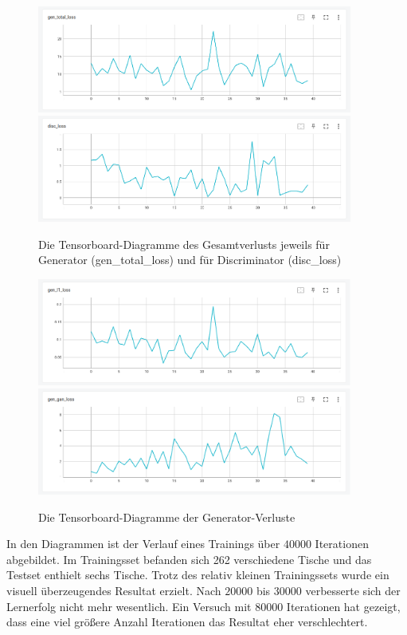 \begin{figure}[h]
	\centering
	\includegraphics[width=0.925\textwidth]{bilder/pix2pix_progress/gen_total_loss.png}
	\includegraphics[width=0.925\textwidth]{bilder/pix2pix_progress/disc_loss.png}
	\caption[Verlustdiagramm 1]{Die Tensorboard-Diagramme des Gesamtverlusts jeweils für Generator (gen\_total\_loss) und für Discriminator (disc\_loss) }
	\label{fig:pix2pixprogress3}
	\includegraphics[width=0.925\textwidth]{bilder/pix2pix_progress/gen_l1_loss.png}
	\includegraphics[width=0.925\textwidth]{bilder/pix2pix_progress/gen_gan_loss.png}
	\caption[Verlustdiagramm 2]{Die Tensorboard-Diagramme der Generator-Verluste}
	\label{fig:pix2pixprogress4}
\end{figure}

\clearpage

In den Diagrammen ist der Verlauf eines Trainings über $40000$ Iterationen abgebildet. Im Trainingsset befanden sich 262 verschiedene Tische und das Testset enthielt sechs Tische. Trotz des relativ kleinen Trainingssets wurde ein visuell überzeugendes Resultat erzielt. Nach $20000$ bis $30000$ verbesserte sich der Lernerfolg nicht mehr wesentlich. Ein Versuch mit $80000$ Iterationen hat gezeigt, dass eine viel größere Anzahl Iterationen das Resultat eher verschlechtert.

